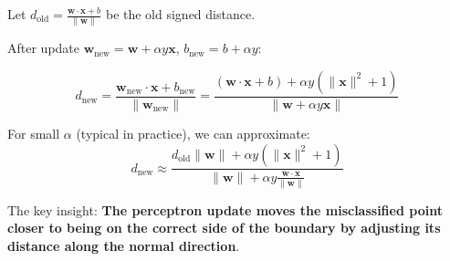 \begin{notechapter}
Let $d_{\text{old}} = \frac{\mathbf{w} \cdot \mathbf{x} + b}{\|\mathbf{w}\|}$ be the old signed distance.

After update $\mathbf{w}_{\text{new}} = \mathbf{w} + \alpha y \mathbf{x}$, $b_{\text{new}} = b + \alpha y$:

\[
d_{\text{new}} = \frac{\mathbf{w}_{\text{new}} \cdot \mathbf{x} + b_{\text{new}}}{\|\mathbf{w}_{\text{new}}\|}
= \frac{(\mathbf{w} \cdot \mathbf{x} + b) + \alpha y(\|\mathbf{x}\|^2 + 1)}{\|\mathbf{w} + \alpha y \mathbf{x}\|}
\]

For small $\alpha$ (typical in practice), we can approximate:
\[
d_{\text{new}} \approx \frac{d_{\text{old}} \|\mathbf{w}\| + \alpha y(\|\mathbf{x}\|^2 + 1)}{\|\mathbf{w}\| + \alpha y \frac{\mathbf{w} \cdot \mathbf{x}}{\|\mathbf{w}\|}}
\]

The key insight: \textbf{The perceptron update moves the misclassified point closer to being on the correct side of the boundary by adjusting its distance along the normal direction}.
\end{notechapter}
